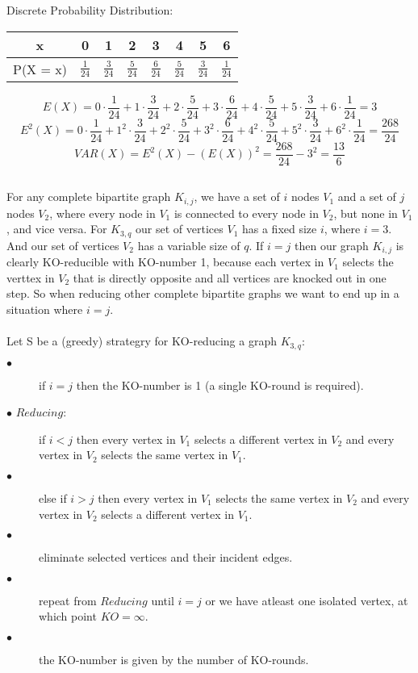 \documentclass[]{article}
\begin{document}
Discrete Probability Distribution:
\begin{center}
\begin{tabular}{|c|c|c|c|c|c|c|c|}
	\hline 
	x & 0 & 1 & 2 & 3 & 4 & 5 & 6\\ 
	\hline 
	P(X = x) & $\frac{1}{24}$ & $\frac{3}{24}$ & $\frac{5}{24}$ & $\frac{6}{24}$ & $\frac{5}{24}$ & $\frac{3}{24}$ & $\frac{1}{24}$ \\ 
	\hline 
\end{tabular} 
\end{center}
$$ E(X) = 0 \cdot \frac{1}{24} + 1 \cdot \frac{3}{24} + 2 \cdot \frac{5}{24} + 3 \cdot \frac{6}{24} + 4 \cdot \frac{5}{24} + 5 \cdot \frac{3}{24} + 6 \cdot \frac{1}{24} = 3 $$
$$ E^2(X) = 0 \cdot \frac{1}{24} + 1 ^ 2 \cdot \frac{3}{24} + 2 ^ 2 \cdot \frac{5}{24} + 3 ^ 2 \cdot \frac{6}{24} + 4 ^ 2 \cdot \frac{5}{24} + 5 ^ 2 \cdot \frac{3}{24} + 6 ^ 2 \cdot \frac{1}{24} = \frac{268}{24}$$
$$VAR(X) = E^2(X) - (E(X))^2 = \frac{268}{24} - 3 ^ 2 = \frac{13}{6} $$
\subsection{}
For any complete bipartite graph $K_{i,j}$, we have a set of $i$ nodes $V_{1}$ and a set of $j$ nodes $V_{2}$, where every node in $V_{1}$ is connected to every node in $V_{2}$, but none in $V_{1}$, and vice versa. For $K_{3,q}$ our set of vertices $V_{1}$ has a fixed size $i$, where $i = 3$. And our set of vertices $V_{2}$ has a variable size of $q$. If $i = j$ then our graph $K_{i,j}$ is clearly KO-reducible with KO-number 1, because each vertex in $V_{1}$ selects the verttex in $V_{2}$ that is directly opposite and all vertices are knocked out in one step. So when reducing other complete bipartite graphs we want to end up in a situation where $i = j$. 
\\
\\
Let S be a (greedy) strategry for KO-reducing a graph $K_{3,q}$:
\begin{description}
\item [$\bullet$]if $i = j$ then the KO-number is 1 (a single KO-round is required).
\item [$\bullet$ $Reducing:$]if $i < j$ then every vertex in $V_1$ selects a different vertex in $V_2$ and every vertex in $V_2$ selects the same vertex in $V_1$.
\item [$\bullet$]else if $i > j$ then every vertex in $V_1$ selects the same vertex in $V_2$ and every vertex in $V_2$ selects a different vertex in $V_1$.
\item[$\bullet$]eliminate selected vertices and their incident edges.
\item [$\bullet$]repeat from $Reducing$ until $i = j$ or we have atleast one isolated vertex, at which point $KO = \infty$.
\item[$\bullet$] the KO-number is given by the number of KO-rounds.
\end{description}
\end{document}
